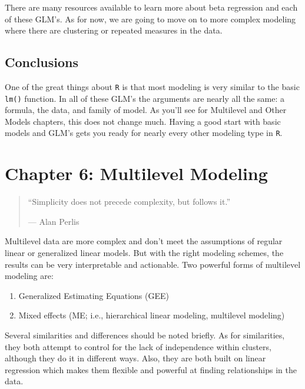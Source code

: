 \documentclass[]{tufte-book}
\providecommand{\tightlist}{%
  \setlength{\itemsep}{0pt}\setlength{\parskip}{0pt}}
\theoremstyle{definition}
\theoremstyle{definition}
\theoremstyle{remark}
\begin{document}
There are many resources available to learn more about beta regression
and each of these GLM's. As for now, we are going to move on to more
complex modeling where there are clustering or repeated measures in the
data.

\section*{Conclusions}\label{conclusions-1}

One of the great things about \texttt{R} is that most modeling is very
similar to the basic \texttt{lm()} function. In all of these GLM's the
arguments are nearly all the same: a formula, the data, and family of
model. As you'll see for Multilevel and Other Models chapters, this does
not change much. Having a good start with basic models and GLM's gets
you ready for nearly every other modeling type in \texttt{R}.

\chapter*{Chapter 6: Multilevel
Modeling}\label{chapter-6-multilevel-modeling}

\begin{quote}
``Simplicity does not precede complexity, but follows it.''

--- Alan Perlis
\end{quote}

Multilevel data are more complex and don't meet the assumptions of
regular linear or generalized linear models. But with the right modeling
schemes, the results can be very interpretable and actionable. Two
powerful forms of multilevel modeling are:

\begin{enumerate}
\def\labelenumi{\arabic{enumi}.}
\tightlist
\item
  Generalized Estimating Equations (GEE)
\item
  Mixed effects (ME; i.e., hierarchical linear modeling, multilevel
  modeling)
\end{enumerate}

Several similarities and differences should be noted briefly. As for
similarities, they both attempt to control for the lack of independence
within clusters, although they do it in different ways. Also, they are
both built on linear regression which makes them flexible and powerful
at finding relationships in the data.
\end{document}
